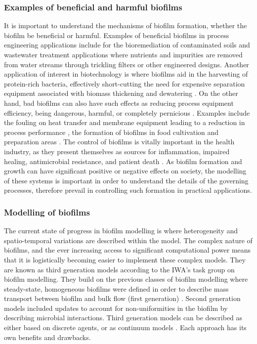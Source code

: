 \subsubsection{Examples of beneficial and harmful biofilms}
It is important to understand the mechanisms of biofilm formation, whether the biofilm be beneficial or harmful. Examples of beneficial biofilms in process engineering applications include for the bioremediation of contaminated soils \cite{singh2006} and wastewater treatment applications where nutrients and impurities are removed from water streams through trickling filters or other engineered designs. Another application of interest in biotechnology is where biofilms aid in the harvesting of protein-rich bacteria, effectively short-cutting the need for expensive separation equipment associated with biomass thickening and dewatering \cite{hulsen2016a}.
\skippingparagraph
On the other hand, bad biofilms can also have such effects as reducing process equipment efficiency, being dangerous, harmful, or completely pernicious \cite{donlan2002}. Examples include the fouling on heat transfer and membrane equipment leading to a reduction in process performance \cite{mcdonogh1994}, the formation of biofilms in food cultivation and preparation areas \cite{wirtanen2003}. The control of biofilms is vitally important in the health industry, as they present themselves as sources for inflammation, impaired healing, antimicrobial resistance, and patient death \cite{bryers2008}. As biofilm formation and growth can have significant positive or negative effects on society, the modelling of these systems is important in order to understand the details of the governing processes, therefore prevail in controlling such formation in practical applications. 


\subsubsection{Modelling of biofilms}
The current state of progress in biofilm modelling is where heterogeneity and spatio-temporal variations are described within the model. The complex nature of biofilms, and the ever increasing access to significant computational power means that it is logistically becoming easier to implement these complex models. They are known as third generation models according to the IWA's task group on biofilm modelling. They build on the previous classes of biofilm modelling where steady-state, homogeneous biofilms were defined in order to describe mass transport between biofilm and bulk flow (first generation) \cite{wanner2006}. Second generation models included updates to account for non-uniformities in the biofilm by describing microbial interactions. Third generation models can be described as either based on discrete agents, or as continuum models \cite{dacunto2017}. Each approach has its own benefits and drawbacks.\\

